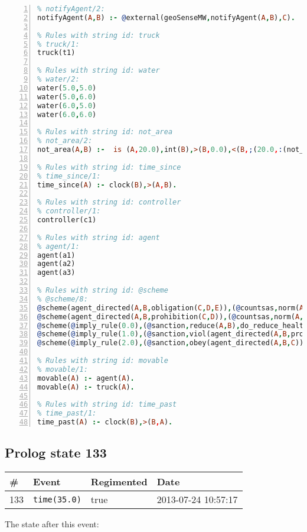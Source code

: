\documentclass[11pt]{article}\usepackage[utf8]{inputenc}\usepackage{geometry}
\begin{document}
\begin{lstlisting}[language=Prolog, numbers=left]
% Rules with string id: notifyAgent
% notifyAgent/2:
notifyAgent(A,B) :- @external(geoSenseMW,notifyAgent(A,B),C).

% Rules with string id: truck
% truck/1:
truck(t1)

% Rules with string id: water
% water/2:
water(5.0,5.0)
water(5.0,6.0)
water(6.0,5.0)
water(6.0,6.0)

% Rules with string id: not_area
% not_area/2:
not_area(A,B) :-  is (A,20.0),int(B),>(B,0.0),<(B,;(20.0,:(not_area(A,B), is (-(B),20.0)))),int(A),>(A,0.0),<(A,;(20.0,:(area(A,B),-(int(A))))),int(B),>(A,0.0),>(B,0.0),<(A,21.0),<(B,21.0).

% Rules with string id: time_since
% time_since/1:
time_since(A) :- clock(B),>(A,B).

% Rules with string id: controller
% controller/1:
controller(c1)

% Rules with string id: agent
% agent/1:
agent(a1)
agent(a2)
agent(a3)

% Rules with string id: @scheme
% @scheme/8:
@scheme(agent_directed(A,B,obligation(C,D,E)),(@countsas,norm(A,B,F,obligation(C,D,E)),F),false,(listTrue(C)),(time_past(D)),false,[plus(viol(agent_directed(A,B,obligation(C,D,E))))|[]],[plus(obey(agent_directed(A,B,obligation(C,D,E))))|[]])
@scheme(agent_directed(A,B,prohibition(C,D)),(@countsas,norm(A,B,E,prohibition(C,D)),E),(listTrue(C)),false,(false),false,[plus(viol(agent_directed(A,B,prohibition(C,D))))|[]],[plus(obey(agent_directed(A,B,prohibition(C,D))))|[]])
@scheme(@imply_rule(0.0),(@sanction,reduce(A,B),do_reduce_health(A,B),notifyAgent(A,changed(status))),true,false,false,false,[min(reduce(A,B))|[]],[])
@scheme(@imply_rule(1.0),(@sanction,viol(agent_directed(A,B,prohibition(C,D))),do_sanction(D)),true,false,false,false,[min(viol(agent_directed(A,B,prohibition(C,D))))|[]],[])
@scheme(@imply_rule(2.0),(@sanction,obey(agent_directed(A,B,C))),true,false,false,false,[min(obey(agent_directed(A,B,C)))|[]],[])

% Rules with string id: movable
% movable/1:
movable(A) :- agent(A).
movable(A) :- truck(A).

% Rules with string id: time_past
% time_past/1:
time_past(A) :- clock(B),>(B,A).

\end{lstlisting}
\clearpage 
\subsection{Prolog state 133}
\begin{table}[ht]
\centering 
\begin{tabular}{l l l l} 
\textbf{\#} & \textbf{Event} & \textbf{Regimented} & \textbf{Date} \\ [0.5ex] 
\hline
133&\texttt{time(35.0)}&true&2013-07-24 10:57:17\\ [1ex] \hline\end{tabular}
\end{table}
The state after this event:
\end{document}
